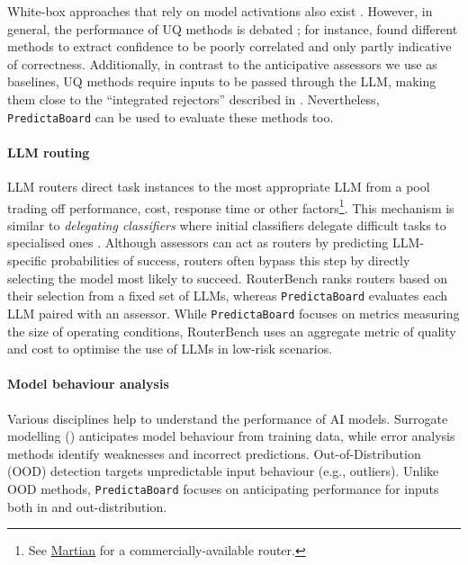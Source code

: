 \documentclass[11pt]{article}
\newcommand{\predbench}{{\tt PredictaBoard}\xspace}
\begin{document}
White-box approaches that rely on model activations also exist \citep{ferrando2025do}.
However, in general, the performance of UQ methods is debated \citep{kapoor}; for instance, \citet{pawitan2024confidence} found  different methods to extract confidence to be poorly correlated and only partly indicative of correctness.
Additionally, in contrast to the anticipative assessors we use as baselines, %
UQ methods require inputs to be passed through the LLM, making them close to the ``integrated rejectors'' described in \cite{hendrickx2024machine}. Nevertheless, \predbench can be used to evaluate these methods too.



\paragraph{LLM routing}
LLM routers \citep{lee2023orchestrallm,vsakota2024fly,lu2023routing,shnitzer2023LargeLanguageModel,ding2024hybrid}
direct task instances to the most appropriate LLM from a pool 
trading off performance, cost, response time or other factors\footnote{See \href{https://withmartian.com/}{Martian} for a commercially-available router.}.
This mechanism %
is similar to %
\textit{delegating classifiers}  where initial classifiers delegate difficult tasks to %
specialised ones 
\citep{ferri2004delegating}. Although assessors can act %
as routers by predicting LLM-specific probabilities of success, routers often bypass this step by directly selecting the model most likely to succeed. %
RouterBench \citep{hu2024routerbench} ranks routers based on their selection from a fixed set of LLMs, whereas \predbench evaluates each LLM paired with an  assessor.  %
While \predbench focuses on metrics %
measuring the size of operating conditions,  %
RouterBench uses an aggregate metric of %
quality and cost to optimise the use of %
LLMs in low-risk scenarios.


\paragraph{Model behaviour analysis} Various disciplines  %
help %
to understand the performance of %
AI models. %
 Surrogate modelling %
(\citealp{ilyas2022datamodels}) %
anticipates model behaviour from training data, while %
error analysis methods \cite{amershi2015modeltracker} %
identify %
weaknesses and %
incorrect predictions. Out-of-Distribution (OOD) detection \cite{hendrycks2016baseline,liang2017enhancing} targets %
unpredictable input behaviour (e.g., outliers). Unlike OOD methods, %
\predbench focuses on %
anticipating performance for inputs both in and out-distribution.
\end{document}

